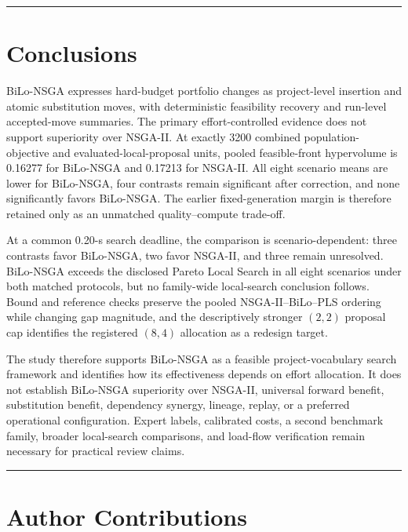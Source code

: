 \documentclass[applsci,article,submit,moreauthors]{Definitions/mdpi}
\begin{document}
\begin{center}\rule{0.5\linewidth}{0.5pt}\end{center}

\section{Conclusions}\label{conclusions}

BiLo-NSGA expresses hard-budget portfolio changes as project-level insertion and atomic substitution moves, with deterministic feasibility recovery and run-level accepted-move summaries. The primary effort-controlled evidence does not support superiority over NSGA-II. At exactly 3200 combined population-objective and evaluated-local-proposal units, pooled feasible-front hypervolume is 0.16277 for BiLo-NSGA and 0.17213 for NSGA-II. All eight scenario means are lower for BiLo-NSGA, four contrasts remain significant after correction, and none significantly favors BiLo-NSGA. The earlier fixed-generation margin is therefore retained only as an unmatched quality--compute trade-off.

At a common 0.20-s search deadline, the comparison is scenario-dependent: three contrasts favor BiLo-NSGA, two favor NSGA-II, and three remain unresolved. BiLo-NSGA exceeds the disclosed Pareto Local Search in all eight scenarios under both matched protocols, but no family-wide local-search conclusion follows. Bound and reference checks preserve the pooled NSGA-II--BiLo--PLS ordering while changing gap magnitude, and the descriptively stronger \((2,2)\) proposal cap identifies the registered \((8,4)\) allocation as a redesign target.

The study therefore supports BiLo-NSGA as a feasible project-vocabulary search framework and identifies how its effectiveness depends on effort allocation. It does not establish BiLo-NSGA superiority over NSGA-II, universal forward benefit, substitution benefit, dependency synergy, lineage, replay, or a preferred operational configuration. Expert labels, calibrated costs, a second benchmark family, broader local-search comparisons, and load-flow verification remain necessary for practical review claims.

\begin{center}\rule{0.5\linewidth}{0.5pt}\end{center}

\section*{Author Contributions}
\end{document}
